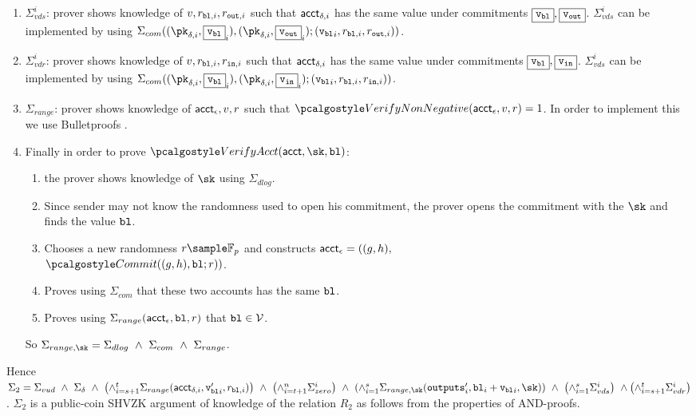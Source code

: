 \begin{enumerate}
     \item $\Sigma^{i}_{vds}$: prover shows knowledge of $v, r_{\textup{\texttt{{bl}}},i}, r_{\textup{\texttt{{out}}},i}$ such that $\textup{\textsf{acct}}_{\delta,i}$ has the same value under commitments $\fbox{$\textup{\texttt{{v}}}_{\textup{\texttt{{bl}}}}$}, \fbox{$\textup{\texttt{{v}}}_{\textup{\texttt{{out}}}}$}$.
     $\Sigma^{i}_{vds}$ can be implemented by using $\Sigma_{com}((\pk_{\delta,i}, \comm{\vbl}_i), (\pk_{\delta,i}, \comm{\vout}_i); ({\vbl}_i, r_{\varbl,i}, r_{\varout,i}))$.

     \item $\Sigma^{i}_{vdr}$: prover shows knowledge of $v, r_{\textup{\texttt{{bl}}},i}, r_{\textup{\texttt{{in}}},i}$ such that $\textup{\textsf{acct}}_{\delta,i}$ has the same value under commitments $\fbox{$\textup{\texttt{{v}}}_{\textup{\texttt{{bl}}}}$}, \fbox{$\textup{\texttt{{v}}}_{\textup{\texttt{{in}}}}$}$.
     $\Sigma^{i}_{vds}$ can be implemented by using $\Sigma_{com}((\pk_{\delta,i}, \comm{\vbl}_i), (\pk_{\delta,i}, \comm{\vin}_i); ({\vbl}_i, r_{\varbl,i}, r_{\varin,i}))$.

     \item $\Sigma_{range}$: prover shows knowledge of $\textup{\textsf{acct}}_{\epsilon}, v, r$ such that $\vernonneg(\acct_{\epsilon},v,r)=1$. In order to implement this we use Bulletproofs \cite{Bulletproofs}.

     \item Finally in order to prove $\veract(\acct, \sk, \varbl)$:
     \begin{enumerate}
        \item the prover shows knowledge of $\sk$ using $\Sigma_{dlog}$. 
        \item Since sender may not know the randomness used to open his commitment, the prover opens the commitment with the $\sk$ and finds the value $\textup{\texttt{{bl}}}$.
        \item Chooses a new randomness $r \sample \mathbb{F}_p$ and constructs $\textup{\textsf{acct}}_{\epsilon} = ((g,h),$ \\ $ \commit((g,h),\varbl;r))$.
        \item Proves using $\Sigma_{com}$ that these two accounts has the same $\textup{\texttt{{bl}}}$.
        \item Proves using $\Sigma_{range}(\textup{\textsf{acct}}_{\epsilon}, \textup{\texttt{{bl}}}, r)$ that $\textup{\texttt{{bl}}} \in \mathcal{V}$. 
     \end{enumerate}
     So $\Sigma_{range, \sk} = \Sigma_{dlog} \ \land \ \Sigma_{com} \ \land \ \Sigma_{range}$.

\end{enumerate}
Hence $\Sigma_2 = \Sigma_{vud} \ \land \ \Sigma_{\delta} \ \land \ \left( \land_{i=s+1}^{t} \Sigma_{range}(\acct_{\delta,i}, {\vbl'}_i, r_{\varbl,i}) \right) \ \land \ \left( \land_{i=t+1}^{n} \Sigma^{i}_{zero} \right) \ \land \ \left( \land_{i=1}^{s} \Sigma_{range, \sk}(\outputs'_i, \varbl_i + {\vbl}_i, \sk) \right) \ \land \ \left( \land_{i=1}^{s} \Sigma^{i}_{vds} \right) \ \land \left( \land_{i=s+1}^{t} \Sigma^{i}_{vdr} \right)$. $\Sigma_2$ is a public-coin SHVZK argument of knowledge of the relation $R_2$ as follows from the properties of AND-proofs.

